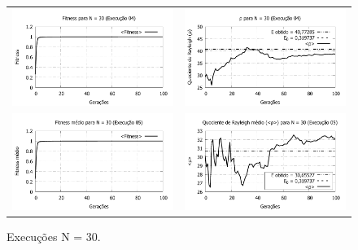 \begin{figure}[phtb]
\begin{tabular}{@{}cc@{}}
		\includegraphics[width=.40\textwidth]{figs/resultados/N30_04_fitness.pdf} &
    \includegraphics[width=.40\textwidth]{figs/resultados/N30_04_rho.pdf}   \\
		\includegraphics[width=.40\textwidth]{figs/resultados/N30_05_fitness.pdf} &
    \includegraphics[width=.40\textwidth]{figs/resultados/N30_05_rho.pdf}
  \end{tabular}
  \caption{Execuções N = 30.}
	\label{fig:execucoes_N30}
\end{figure}

